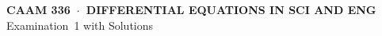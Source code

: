 \documentclass[11pt]{article}
\begin{document}
\thispagestyle{empty}
\vspace*{0em}
   \begin{center}
      \textsf{\textbf{CAAM 336\ $\cdot$\ DIFFERENTIAL EQUATIONS IN SCI AND ENG}}\\[0.5em]
       \textsf{Examination~1 with Solutions}
   \end{center}
   
\vspace*{3em}
%
%
%
%
%
%
%
%
\end{document}
